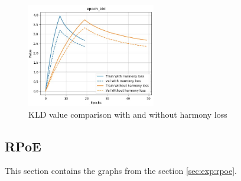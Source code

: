 \documentclass[12pt]{report}
\begin{document}
\begin{figure}[htbp]
    \centering
    \includegraphics[width=0.5\textwidth]{images/experiences/harmony-rnn/kld-comparison-harmony.jpg}
    \caption{KLD value comparison with and without harmony loss}
    \label{fig:kld-comparison-harmony}
\end{figure}


\subsection{RPoE}
\label{appendix:exp:rpoe}

This section contains the graphs from the section \ref{sec:exp:rpoe}.
\end{document}
